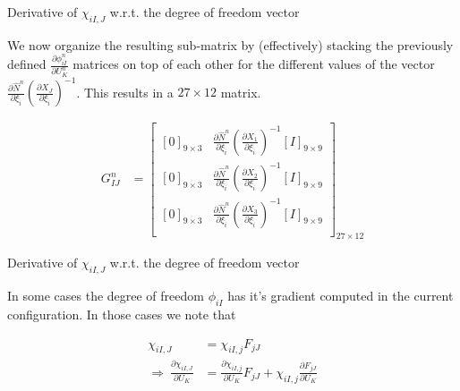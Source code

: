 \documentclass[11pt]{beamer}
\begin{document}
\begin{frame}{Derivative of $\chi_{iI,J}$ w.r.t. the degree of freedom vector}

We now organize the resulting sub-matrix by (effectively) stacking the previously defined $\frac{\partial \phi_{iI}^n}{\partial U_K^n}$ matrices on top of each other for the different values of the vector $\frac{\partial \hat{N}^n}{\partial \xi_{\hat{i}}}\left(\frac{\partial X_J}{\partial \xi_{\hat{i}}}\right)^{-1}$. This results in a $27 \times 12$ matrix.

\begin{align*}
G_{IJ}^n &= \left[\begin{array}{cc}
\left[0\right]_{9\times 3} & \frac{\partial \hat{N}^n}{\partial \xi_{\hat{i}}}\left(\frac{\partial X_1}{\partial \xi_{\hat{i}}}\right)^{-1} \left[I\right]_{9 \times 9}\\
\left[0\right]_{9\times 3} & \frac{\partial \hat{N}^n}{\partial \xi_{\hat{i}}}\left(\frac{\partial X_2}{\partial \xi_{\hat{i}}}\right)^{-1} \left[I\right]_{9 \times 9}\\
\left[0\right]_{9\times 3} & \frac{\partial \hat{N}^n}{\partial \xi_{\hat{i}}}\left(\frac{\partial X_3}{\partial \xi_{\hat{i}}}\right)^{-1} \left[I\right]_{9 \times 9}\\
\end{array}\right]_{27 \times 12}
\end{align*}

\end{frame}

\begin{frame}{Derivative of $\chi_{iI,J}$ w.r.t. the degree of freedom vector}

In some cases the degree of freedom $\phi_{iI}$ has it's gradient computed in the current configuration. In those cases we note that

\begin{align*}
\chi_{iI,J} &= \chi_{iI,j} F_{jJ}\\
\Rightarrow\ \frac{\partial \chi_{iI,J}}{\partial U_K} &= \frac{\partial \chi_{iI,j}}{\partial U_K} F_{jJ} + \chi_{iI,j} \frac{\partial F_{jJ}}{\partial U_K}\\
\end{align*}

\end{frame}
\end{document}
